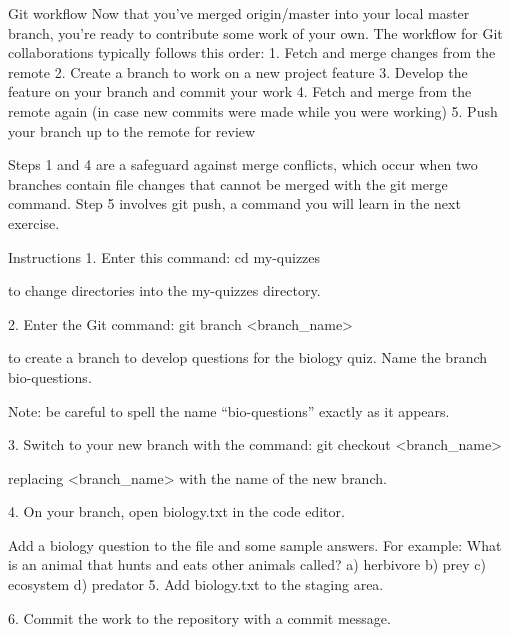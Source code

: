 Git workflow
    Now that you’ve merged origin/master into your local master branch, you’re ready to contribute some work of your own. The workflow for Git collaborations typically follows this order:
        1. Fetch and merge changes from the remote
        2. Create a branch to work on a new project feature
        3. Develop the feature on your branch and commit your work
        4. Fetch and merge from the remote again (in case new commits were made while you were working)
        5. Push your branch up to the remote for review
        
    Steps 1 and 4 are a safeguard against merge conflicts, which occur when two branches contain file changes that cannot be merged with the git merge command. Step 5 involves git push, a command you will learn in the next exercise.

Instructions
    1.
    Enter this command:
        cd my-quizzes

    to change directories into the my-quizzes directory.

    2.
    Enter the Git command:
        git branch <branch_name>
    
    to create a branch to develop questions for the biology quiz. Name the branch bio-questions.

    Note: be careful to spell the name “bio-questions” exactly as it appears.

    3.
    Switch to your new branch with the command:
        git checkout <branch_name>
    
    replacing <branch_name> with the name of the new branch.

    4.
    On your branch, open biology.txt in the code editor.

    Add a biology question to the file and some sample answers. For example:
        What is an animal that hunts and eats other animals called?
        a) herbivore
        b) prey 
        c) ecosystem 
        d) predator
    5.
    Add biology.txt to the staging area.

    6.
    Commit the work to the repository with a commit message.